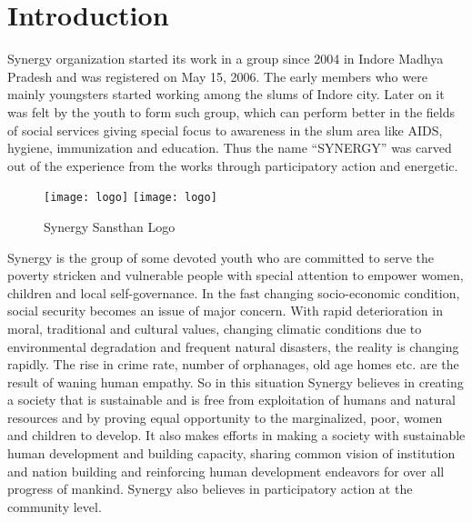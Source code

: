 \chapter{Introduction}
\ifpdf
    \graphicspath{{Introduction/IntroductionFigs/PNG/}{Introduction/IntroductionFigs/PDF/}{Introduction/IntroductionFigs/}}
\else
    \graphicspath{{Introduction/IntroductionFigs/EPS/}{Introduction/IntroductionFigs/}}
\fi

Synergy organization started its work in a group since 2004 in Indore Madhya Pradesh and was registered on May 15, 2006. The early members who were mainly youngsters started working among the slums of Indore city. Later on it was felt by the youth to form such group, which can perform better in the fields of social services giving special focus to awareness in the slum area like AIDS, hygiene, immunization and education. Thus the name ``SYNERGY'' was carved out of the experience from the works through participatory action and energetic. \newline

\begin{figure}[!htbp]
  \begin{center}
    \leavevmode
    \ifpdf
      \texttt{[image: logo]}
    \else
      \texttt{[image: logo]}
    \fi
    \caption{Synergy Sansthan Logo}
    \label{FigAir}
  \end{center}
\end{figure}


Synergy is the group of some devoted youth who are committed to serve the poverty stricken and vulnerable people with special attention to empower women, children and local self-governance. In the fast changing socio-economic condition, social security becomes an issue of major concern. With rapid deterioration in moral, traditional and cultural values, changing climatic conditions due to environmental degradation and frequent natural disasters, the reality is changing rapidly. The rise in crime rate, number of orphanages, old age homes etc. are the result of waning human empathy. So in this situation Synergy believes in creating a society that is sustainable and is free from exploitation of humans and natural resources and by proving equal opportunity to the marginalized, poor, women and children to develop. It also makes efforts in making a society with sustainable human development and building capacity, sharing common vision of institution and nation building and reinforcing human development endeavors for over all progress of mankind. Synergy also believes in participatory action at the community level.


